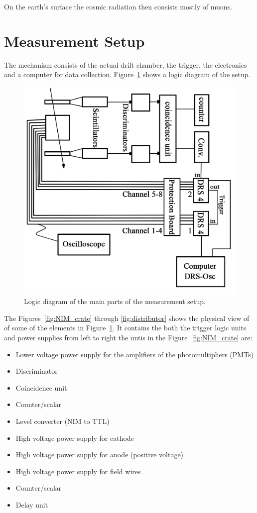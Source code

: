 \documentclass[12pt]{article}
\begin{document}
On the earth's surface the cosmic radiation then consists mostly of muons.

\section{Measurement Setup}

The mechanism consists of the actual drift chamber, the trigger, the electronics and a computer for data collection. Figure~\ref{fig:schema} shows a logic diagram of the setup. 

\begin{figure}[!h]
\includegraphics[width=13cm]{pics/Schema.jpg}
\centering
\caption{Logic diagram of the main parts of the measurement setup.}
\label{fig:schema}
\end{figure}

The Figures~\ref{fig:NIM_crate} through \ref{fig:distributor} shows the physical view of of some of the elements in Figure~\ref{fig:schema}. It contains the both the trigger logic units and power supplies from left to right the untis in the Figure~\ref{fig:NIM_crate} are:
\begin{itemize}
\item Lower voltage power supply for the amplifiers of the photomultipliers (PMTs)
\item Discriminator
\item Coincidence unit
\item Counter/scalar
\item Level converter (NIM to TTL)
\item High voltage power supply for cathode
\item High voltage power supply for anode (positive voltage)
\item High voltage power supply for field wires
\item Counter/scalar 
\item Delay unit
\end{itemize}
\end{document}
